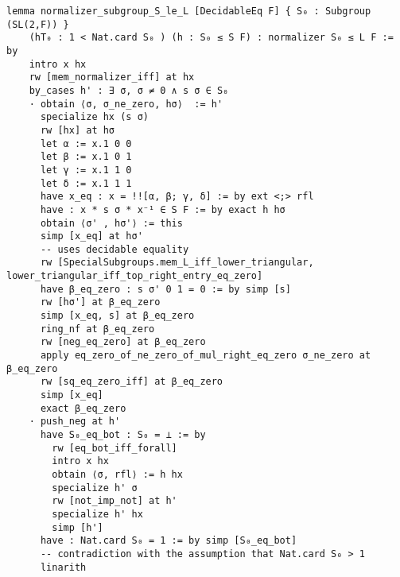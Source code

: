 \begin{footnotesize}
\begin{verbatim}
lemma normalizer_subgroup_S_le_L [DecidableEq F] { S₀ : Subgroup (SL(2,F)) }
    (hT₀ : 1 < Nat.card S₀ ) (h : S₀ ≤ S F) : normalizer S₀ ≤ L F := by
    intro x hx
    rw [mem_normalizer_iff] at hx
    by_cases h' : ∃ σ, σ ≠ 0 ∧ s σ ∈ S₀
    · obtain ⟨σ, σ_ne_zero, hσ⟩  := h'
      specialize hx (s σ)
      rw [hx] at hσ
      let α := x.1 0 0
      let β := x.1 0 1
      let γ := x.1 1 0
      let δ := x.1 1 1
      have x_eq : x = !![α, β; γ, δ] := by ext <;> rfl
      have : x * s σ * x⁻¹ ∈ S F := by exact h hσ
      obtain ⟨σ' , hσ'⟩ := this
      simp [x_eq] at hσ'
      -- uses decidable equality
      rw [SpecialSubgroups.mem_L_iff_lower_triangular, lower_triangular_iff_top_right_entry_eq_zero]
      have β_eq_zero : s σ' 0 1 = 0 := by simp [s]
      rw [hσ'] at β_eq_zero
      simp [x_eq, s] at β_eq_zero
      ring_nf at β_eq_zero
      rw [neg_eq_zero] at β_eq_zero
      apply eq_zero_of_ne_zero_of_mul_right_eq_zero σ_ne_zero at β_eq_zero
      rw [sq_eq_zero_iff] at β_eq_zero
      simp [x_eq]
      exact β_eq_zero
    · push_neg at h'
      have S₀_eq_bot : S₀ = ⊥ := by
        rw [eq_bot_iff_forall]
        intro x hx
        obtain ⟨σ, rfl⟩ := h hx
        specialize h' σ
        rw [not_imp_not] at h'
        specialize h' hx
        simp [h']
      have : Nat.card S₀ = 1 := by simp [S₀_eq_bot]
      -- contradiction with the assumption that Nat.card S₀ > 1
      linarith
\end{verbatim}
\end{footnotesize}

